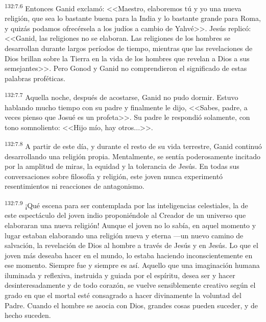\par 
\textsuperscript{132:7.6} Entonces Ganid exclamó: <<Maestro, elaboremos tú y yo una nueva religión, que sea lo bastante buena para la India y lo bastante grande para Roma, y quizás podamos ofrecérsela a los judíos a cambio de Yahvé>>. Jesús replicó: <<Ganid, las religiones no se elaboran. Las religiones de los hombres se desarrollan durante largos períodos de tiempo, mientras que las revelaciones de Dios brillan sobre la Tierra en la vida de los hombres que revelan a Dios a sus semejantes>>. Pero Gonod y Ganid no comprendieron el significado de estas palabras proféticas.

\par 
\textsuperscript{132:7.7} Aquella noche, después de acostarse, Ganid no pudo dormir. Estuvo hablando mucho tiempo con su padre y finalmente le dijo, <<Sabes, padre, a veces pienso que Josué es un profeta>>. Su padre le respondió solamente, con tono somnoliento: <<Hijo mío, hay otros...>>.

\par 
\textsuperscript{132:7.8} A partir de este día, y durante el resto de su vida terrestre, Ganid continuó desarrollando una religión propia. Mentalmente, se sentía poderosamente incitado por la amplitud de miras, la equidad y la tolerancia de Jesús. En todas sus conversaciones sobre filosofía y religión, este joven nunca experimentó resentimientos ni reacciones de antagonismo.

\par 
\textsuperscript{132:7.9} ¡Qué escena para ser contemplada por las inteligencias celestiales, la de este espectáculo del joven indio proponiéndole al Creador de un universo que elaboraran una nueva religión! Aunque el joven no lo sabía, en aquel momento y lugar estaban elaborando una religión nueva y eterna ---un nuevo camino de salvación, la revelación de Dios al hombre a través de Jesús y en Jesús. Lo que el joven más deseaba hacer en el mundo, lo estaba haciendo inconscientemente en ese momento. Siempre fue y siempre es así. Aquello que una imaginación humana iluminada y reflexiva, instruida y guiada por el espíritu, desea ser y hacer desinteresadamente y de todo corazón, se vuelve sensiblemente creativo según el grado en que el mortal esté consagrado a hacer divinamente la voluntad del Padre. Cuando el hombre se asocia con Dios, grandes cosas pueden suceder, y de hecho suceden.